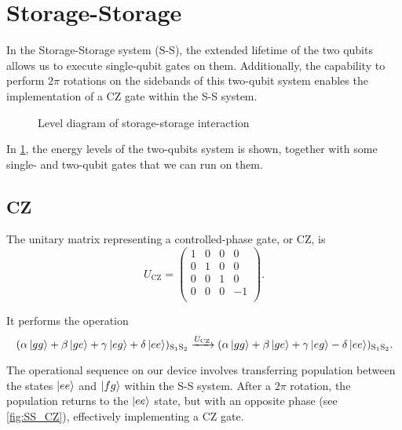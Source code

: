 
\section{Storage-Storage}
\label{sec:S-S}

In the Storage-Storage system (S-S), the extended lifetime of the two qubits allows us to execute single-qubit gates on them.
Additionally, the capability to perform $2\pi$ rotations on the sidebands of this two-qubit system enables the implementation of a CZ gate within the S-S system.

\begin{figure}
    \centering
    
    \vspace{-1cm}
    \caption{Level diagram of storage-storage interaction}
    \label{fig:SS_level}
\end{figure}

In \cref{fig:SS_level}, the energy levels of the two-qubits system is shown, together with some single- and two-qubit gates that we can run on them.

\subsection{CZ}

The unitary matrix representing a controlled-phase gate, or CZ, is
\begin{equation}
    U_{\text{CZ}} = 
    \begin{pmatrix}
    1 & 0 & 0 & 0 \\
    0 & 1 & 0 & 0 \\
    0 & 0 & 1 & 0 \\
    0 & 0 & 0 & -1 \\
\end{pmatrix}.
\end{equation}

It performs the operation
\begin{equation}
    (\alpha \ket{gg} + \beta \ket{ge} + \gamma \ket{eg} + \delta \ket{ee})_{\text{S}_1 \text{S}_2} \xrightarrow{U_{\text{CZ}}}
    (\alpha \ket{gg} + \beta \ket{ge} + \gamma \ket{eg} - \delta \ket{ee})_{\text{S}_1 \text{S}_2} . 
\end{equation}

The operational sequence on our device involves transferring population between the states $\ket{ee}$ and $\ket{fg}$ within the S-S system.
After a $2\pi$ rotation, the population returns to the $\ket{ee}$ state, but with an opposite phase (see \cref{fig:SS_CZ}), effectively implementing a CZ gate.

